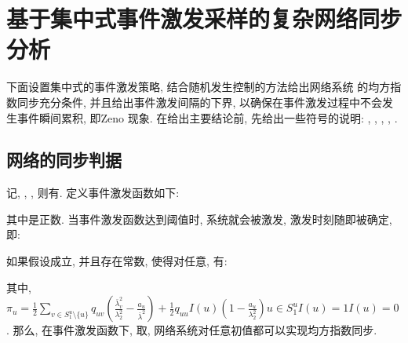 \section{基于集中式事件激发采样的复杂网络同步分析}\label{result}
        下面设置集中式的事件激发策略, 结合随机发生控制的方法给出网络系统  的均方指数同步充分条件, 并且给出事件激发间隔的下界, 以确保在事件激发过程中不会发生事件瞬间累积, 即Zeno 现象. 在给出主要结论前, 先给出一些符号的说明: , , , , .
\subsection{网络的同步判据}
        记, , ,  则有. 定义事件激发函数如下:
        \begin{comment}\label{trirule}
            g(t)=\|\hat{{\delta}}(t)\|-\varpi\|\hat{x}(t)\|,
        \end{comment}
        其中是正数. 当事件激发函数达到阈值时, 系统就会被激发, 激发时刻随即被确定, 即:
        \begin{comment}
            t_{k+1}=\max\{t\ge t_k: g(t)\le 0\}.
        \end{comment}
        \begin{thm}\label{them}
        如果假设成立, 并且存在常数, 使得对任意, 有:
            \begin{comment}\label{thm:1}
            \left\{
            \begin{commented}
            &\pi+a+\pi_u-c\gamma(\lambda_2+\rho\beta)\leq0,\\
            &2a\lambda_2^2-\bar{\lambda}\alpha_2>0,\\
            &L^2_v-a_uI_N\leq 0, \quad\quad \text{if} \quad v\neq u, v\in S_2^u, \\
            &L^2_v-a_uI_N\geq 0, \quad\quad \text{if} \quad v= u, v\in S_2^u,
            \end{commented}
            \right.
            \end{comment}
        其中, $\pi_u=\frac{1}{2}\sum_{v\in S_1^u\setminus\{u\}}q_{uv}(\frac{\bar{\lambda}^2_{v}}{\lambda_2^2}-\frac{a_u}{\bar{\lambda}^2})
        +\frac{1}{2}q_{uu}I(u)(1-\frac{a_u}{\lambda_2^2})u\in S_1^uI(u)=1I(u)=0$.
        那么, 在事件激发函数下, 取, 网络系统对任意初值都可以实现均方指数同步.
        \end{thm}


